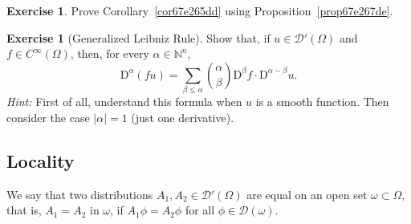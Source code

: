 \documentclass[a4paper,9pt]{amsart}
\newcommand{\scr}[1]{\mathscr{#1}}
\newcommand{\N}{\mathbb{N}}	%
\newcommand{\Diff}{\mathrm{D}}
\theoremstyle{plain}
\theoremstyle{definition}
\newtheorem{exercise}[proposition]{Exercise}%
\theoremstyle{remark}
\begin{document}
\begin{exercise}
	Prove Corollary~\ref{cor67e265dd} using Proposition~\ref{prop67e267de}.
\end{exercise}

\begin{exercise}[Generalized Leibniz Rule]
	 Show that, if $u\in\scr D'(\Omega)$ and $f\in C^\infty(\Omega)$, then, for every $\alpha\in\N^n$,
	 \begin{equation}\label{eq67f2c2e1}
	 	\Diff^\alpha(fu) = \sum_{\beta\le \alpha} \binom{\alpha}{\beta} \Diff^\beta f \cdot \Diff^{\alpha-\beta} u .
	 \end{equation}
	 {\it Hint:} First of all, understand this formula when $u$ is a smooth function.
	 Then consider the case $|\alpha|=1$ (just one derivative).
\end{exercise}

\subsection{Locality}\label{subs67e26aff}
We say that two distributions $A_1,A_2\in\scr D'(\Omega)$ are equal on an open set $\omega\subset\Omega$, that is, $A_1=A_2$ in $\omega$, if $A_1\phi=A_2\phi$ for all $\phi\in\scr D(\omega)$.
\end{document}
